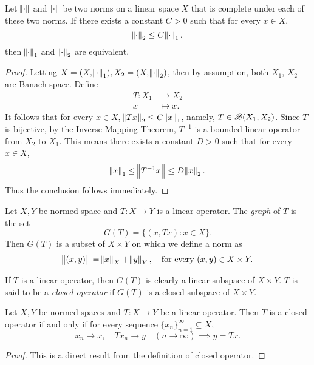 \begin{cor}
Let $\norm{\mathord{\cdot}}$ and $\norm{\mathord{\cdot}}$ be two norms on a linear space $X$ 
that is complete under each of these two norms. 
If there exists a constant $C > 0$ such that for every $x \in  X$, 
\begin{equation*}
    \norm{\mathord{\cdot}}_2 \le C \norm{\mathord{\cdot}}_1, 
\end{equation*} 
then $\norm{\mathord{\cdot}}_1$ and $\norm{\mathord{\cdot}}_2$ are equivalent. 
\end{cor}
\begin{proof}
Letting $X = (X, \norm{\mathord{\cdot}}_1), X_2 = (X, \norm{\mathord{\cdot}}_2)$, then by 
assumption, both $X_1$, $X_2$ are Banach space. 
Define 
\begin{equation*}
    \begin{aligned}
        T: X_1 &\to X_2 \\
        x &\mapsto x.
    \end{aligned}
\end{equation*}
It follows that for every $x \in X$, $\norm{Tx}_2 \le C \norm{x}_1$, namely, 
$T \in \mathscr{B}(X_1, X_2)$. 
Since $T$ is bijective, by the Inverse Mapping Theorem, $T^{-1}$ is a 
bounded linear operator from $X_2$ to $X_1$. 
This means there exists a constant $D > 0$ such that for every $x \in X$, 
\begin{equation*}
    \norm{x}_1 \le \norm{T^{-1}x} \le D \norm{x}_2.
\end{equation*}
Thus the conclusion follows immediately. 
\end{proof}

\begin{defn}[Graph]
Let $X, Y$ be normed space and $T: X \to Y$ is a linear operator. 
The \emph{graph} of $T$ is the set 
\begin{equation*}
    G(T) = \{(x, Tx): x \in X\}.
\end{equation*}
Then $G(T)$ is a subset of $X \times Y$ on which we define a norm as 
\begin{equation*}
    \norm{(x, y)} = \norm{x}_X + \norm{y}_Y, \quad 
    \text{for every } (x, y) \in X \times Y.
\end{equation*}
\end{defn}

If $T$ is a linear operator, then $G(T)$ is clearly a linear subspace of 
$X \times Y$. 
$T$ is said to be a \emph{closed operator} if $G(T)$ is a closed subspace 
of $X \times Y$. 

\begin{prop}
Let $X, Y$ be normed spaces and $T: X \to Y$ be a linear operator. 
Then $T$ is a closed operator if and only if for every sequence 
$\{ x_n \}_{n=1}^{\infty} \subseteq X$, 
\begin{equation*}
    x_n \to x, \quad T x_n \to y \quad (n \to \infty) 
    \implies y = Tx. 
\end{equation*}
\end{prop}
\begin{proof}
This is a direct result from the definition of closed operator. 
\end{proof}

